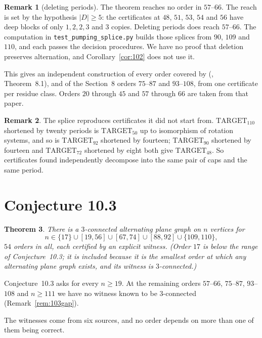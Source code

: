 \documentclass[11pt,a4paper]{amsart}
\theoremstyle{plain}
\newtheorem{theorem}{Theorem}[section]
\theoremstyle{definition}
\newtheorem{remark}[theorem]{Remark}
\begin{document}
\begin{remark}[deleting periods]\label{rem:deletion}
The theorem reaches no order in $57$--$66$. The reach is set by the hypothesis
$|D| \ge 5$: the certificates at $48$, $51$, $53$, $54$ and $56$ have deep
blocks of only $1, 2, 2, 3$ and $3$ copies. Deleting periods does reach
$57$--$66$. The computation in \texttt{test\_pumping\_splice.py} builds those
splices from $90$, $109$ and $110$, and each passes the decision procedures.
We have no proof that deletion preserves alternation, and
Corollary~\ref{cor:102} does not use it.
\end{remark}

This gives an independent construction of every order covered by
(\cite{AHSSV2015}, Theorem~8.1), and of the Section~8 orders $75$--$87$ and
$93$--$108$, from one certificate per residue class. Orders $20$ through $45$
and $57$ through $66$ are taken from that paper.

\begin{remark}
The splice reproduces certificates it did not start from.
$\mathrm{TARGET}_{110}$ shortened by twenty periods is $\mathrm{TARGET}_{50}$ up
to isomorphism of rotation systems, and so is $\mathrm{TARGET}_{92}$ shortened
by fourteen; $\mathrm{TARGET}_{90}$ shortened by fourteen and
$\mathrm{TARGET}_{72}$ shortened by eight both give $\mathrm{TARGET}_{48}$. So
certificates found independently decompose into the same pair of caps and the
same period.
\end{remark}

\section{Conjecture 10.3}\label{sec:103}

\begin{theorem}\label{thm:103}
There is a $3$-connected alternating plane graph on $n$ vertices for
$$n \in \{17\} \cup [19,56] \cup [67,74] \cup [88,92] \cup \{109,110\},$$
$54$ orders in all, each certified by an explicit witness. (Order $17$ is
below the range of Conjecture~10.3; it is included because it is the smallest
order at which any alternating plane graph exists, and its witness is
$3$-connected.)
\end{theorem}

Conjecture~10.3 asks for every $n \ge 19$. At the remaining orders $57$--$66$,
$75$--$87$, $93$--$108$ and $n \ge 111$ we have no witness known to be
$3$-connected (Remark~\ref{rem:103gap}).

The witnesses come from six sources, and no order depends on more than one of
them being correct.
\end{document}
